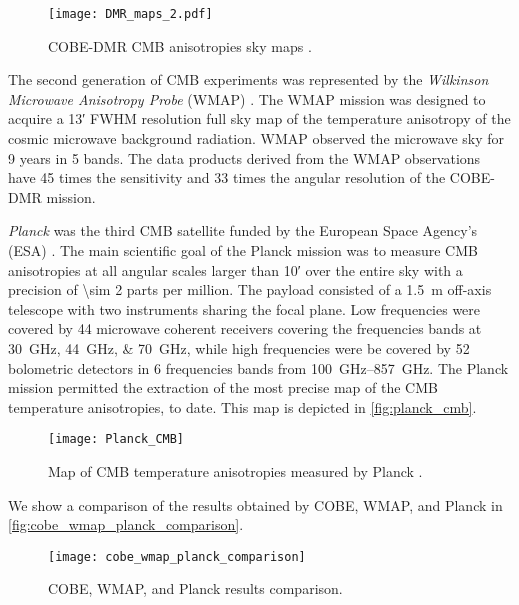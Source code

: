 \begin{figure}
        \centering
        \texttt{[image: DMR\_maps\_2.pdf]}
        \caption{COBE-DMR CMB anisotropies sky maps \autocite{Lambda}.}
        \label{fig:dmr_maps}
\end{figure}

The second generation of CMB experiments was represented by the
\emph{Wilkinson Microwave Anisotropy Probe} (WMAP)
\autocite{spergel2003first}. The WMAP mission was designed to acquire a
\ang{;13;} FWHM resolution full sky map of the temperature anisotropy of
the cosmic microwave background radiation. WMAP observed the microwave sky
for \num{9} years in \num{5} bands. The data products derived from the WMAP
observations have \num{45} times the sensitivity and \num{33} times the
angular resolution of the COBE-DMR mission.

\emph{Planck} was the third CMB satellite funded by the European Space
Agency's (ESA) \autocite{mandolesi2002planck}. The main scientific goal of
the Planck mission was to measure CMB anisotropies at all angular scales
larger than \ang{;10;} over the entire sky with a precision of \num{\sim 2}
parts per million.  The payload consisted of a \SI{1.5}{\meter} off-axis
telescope with two instruments sharing the focal plane. Low frequencies
were covered by \num{44} microwave coherent receivers covering the
frequencies bands at \SIlist{30;44;70}{\giga\hertz}, while high frequencies
were be covered by \num{52} bolometric detectors in \num{6} frequencies
bands from \SIrange{100}{857}{\giga\hertz}.  The Planck mission permitted
the extraction of the most precise map of the CMB temperature anisotropies,
to date. This map is depicted in \autoref{fig:planck_cmb}.

\begin{figure}
        \centering
        \texttt{[image: Planck\_CMB]}
        \caption{Map of CMB temperature anisotropies measured by Planck
        \autocite{adam2016planck}.}
        \label{fig:planck_cmb}
\end{figure}

We show a comparison of the results obtained by COBE, WMAP, and Planck in
\autoref{fig:cobe_wmap_planck_comparison}.

\begin{figure}
        \centering
        \texttt{[image: cobe\_wmap\_planck\_comparison]}
        \caption{COBE, WMAP, and Planck results comparison.}
        \label{fig:cobe_wmap_planck_comparison}
\end{figure}

